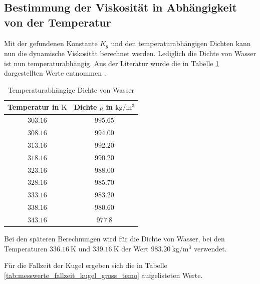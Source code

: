 \subsection{Bestimmung der Viskosität in Abhängigkeit von der Temperatur}
Mit der gefundenen Konstante $K_{g}$ und den temperaturabhängigen Dichten kann nun die dynamische 
Viskosität berechnet werden. %
Lediglich die Dichte von Wasser ist nun temperaturabhängig.
Aus der Literatur wurde die in Tabelle \ref{tab:dichtewasser} dargestellten Werte
entnommen \cite{lit_dichte}.  %

\begin{table}
\centering
\begin{tabular} {cc}
  \toprule
  Temperatur in $\si{\kelvin}$ & Dichte $\rho$ in $\si{\kilogram\per\cubic\meter}$ \\
  \midrule
  $\num{303.16}$ &$\num{995.65}$ \\
  $\num{308.16}$ &$\num{994.00}$\\
  $\num{313.16}$ &$\num{992.20}$\\
  $\num{318.16}$ &$\num{990.20}$\\
  $\num{323.16}$ &$\num{988.00}$\\
  $\num{328.16}$ &$\num{985.70}$\\
  $\num{333.16}$ &$\num{983.20}$\\
  $\num{338.16}$ &$\num{980.60}$\\
  $\num{343.16}$ &$\num{977.8}$\\
\bottomrule
\end{tabular}
\caption{Temperaturabhängige Dichte von Wasser}
\label{tab:dichtewasser}
\end{table}

Bei den späteren Berechnungen wird für die Dichte von Wasser, bei den Temperaturen $\SI{336.16}{\kelvin}$ und $\SI{339.16}{\kelvin}$
der Wert $\SI{983.20}{\kilogram\per\cubic\meter}$ verwendet. %

Für die Fallzeit der Kugel ergeben sich die in  %
Tabelle \ref{tab:messwerte_fallzeit_kugel_gross_temo} aufgelisteten Werte.

